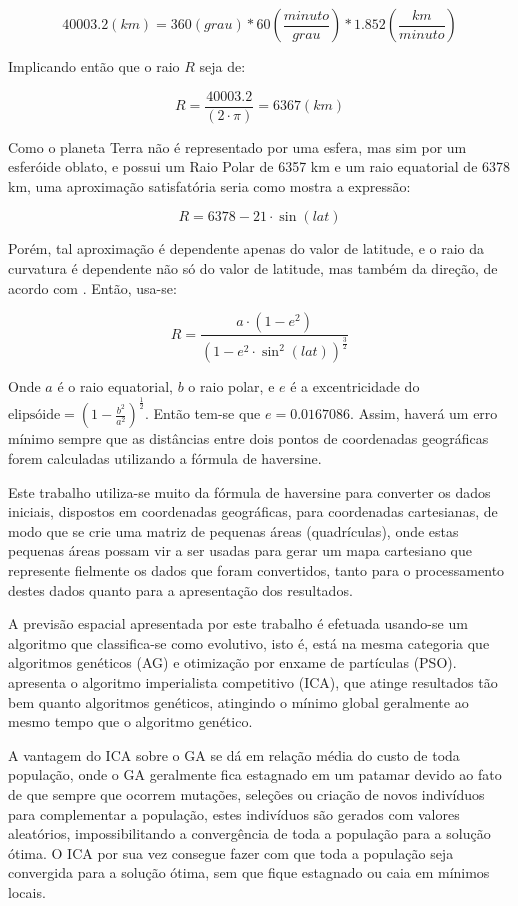 \[40003.2 (km) = 360(grau) * 60\left(\frac{minuto}{grau}\right) * 1.852\left(\frac{km}{minuto}\right)  \]

Implicando então que o raio \(R\) seja de:

\[R = \frac{40003.2}{(2 \cdot \pi)} = 6367 (km) \]

Como o planeta Terra não é representado por uma esfera, mas sim por um esferóide oblato, e possui um Raio Polar de 6357 km e um raio equatorial de 6378 km, uma aproximação satisfatória seria como mostra a expressão:

\[R = 6378 - 21 \cdot \sin(lat) \]

Porém, tal aproximação é dependente apenas do valor de latitude, e o raio da curvatura é dependente não só do valor de latitude, mas também da direção, de acordo com \cite{snyder1987map}. Então, usa-se:

\[R = \frac{ a \cdot (1 - e^2)}{ (1 - e^2 \cdot \sin^2(lat))^\frac{3}{2}}\]

Onde \(a\) é o raio equatorial, \(b\) o raio polar, e \(e\) é a excentricidade do 
\(\text{elipsóide} = \left(1 - \frac{b^2}{a^2}\right)^\frac{1}{2}\). 
Então tem-se que \(e = 0.0167086\). Assim, haverá um erro mínimo sempre que as distâncias entre dois pontos de coordenadas geográficas forem calculadas utilizando a fórmula de haversine.

Este trabalho utiliza-se muito da fórmula de haversine para converter os dados iniciais, dispostos em coordenadas geográficas, para coordenadas cartesianas, de modo que se crie uma matriz de pequenas áreas (quadrículas), onde estas pequenas áreas possam vir a ser usadas para gerar um mapa cartesiano que represente fielmente os dados que foram convertidos, tanto para o processamento destes dados quanto para a apresentação dos resultados.

A previsão espacial apresentada por este trabalho é efetuada usando-se um algoritmo que classifica-se como evolutivo, isto é, está na mesma categoria que  algoritmos genéticos (AG) \cite{mitchell1998introduction} e otimização por enxame de partículas (PSO). \cite{atashpaz2007imperialist} apresenta o algoritmo imperialista competitivo (ICA), que atinge resultados tão bem quanto algoritmos genéticos, atingindo o mínimo global geralmente ao mesmo tempo que o algoritmo genético. 

A vantagem do ICA sobre o GA se dá em relação média do custo de toda população, onde o GA geralmente fica estagnado em um patamar devido ao fato de que sempre que ocorrem mutações, seleções ou criação de novos indivíduos para complementar a população, estes indivíduos são gerados com valores aleatórios, impossibilitando a convergência de toda a população para a solução ótima. O ICA por sua vez consegue fazer com que toda a população seja convergida para a solução ótima, sem que fique estagnado ou caia em mínimos locais.  

